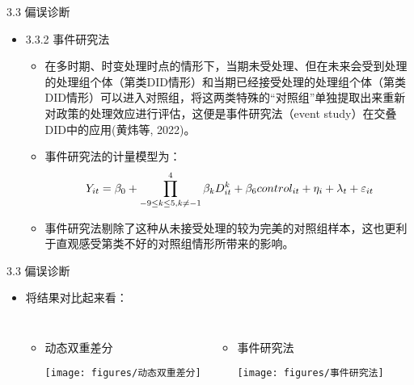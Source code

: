 \documentclass{beamer}%
\begin{document}
\begin{frame}[t]{\large 3.3 偏误诊断}
\begin{itemize}
  \item 3.3.2 事件研究法
  \begin{itemize}
  \item 在多时期、时变处理时点的情形下，当期未受处理、但在未来会受到处理的处理组个体（第类DID情形）和当期已经接受处理的处理组个体（第类DID情形）可以进入对照组，将这两类特殊的“对照组”单独提取出来重新对政策的处理效应进行评估，这便是事件研究法（event study）在交叠DID中的应用(黄炜等, 2022)。
  \item 事件研究法的计量模型为：
    \begin{equation}
    \setlength{\abovedisplayskip}{4pt}
    \setlength{\belowdisplayskip}{4pt}
        Y_{i t}=\beta_0+\prod_{-9 \leq k \leq 5, k \neq-1}^4 \beta_k D_{i t}^k+\beta_6 control_{it}+\eta_i+\lambda_t+\varepsilon_{it}
    \end{equation}
  \item 事件研究法剔除了这种从未接受处理的较为完美的对照组样本，这也更利于直观感受第类不好的对照组情形所带来的影响。
  \end{itemize}
\end{itemize}
\end{frame}

\begin{frame}[t]{\large 3.3 偏误诊断}
\begin{itemize}
\item 将结果对比起来看：
\begin{columns}[onlytextwidth]
\begin{itemize}
\item 动态双重差分
\begin{center}
		\texttt{[image: figures/动态双重差分]}
\end{center}
\end{itemize}
\begin{itemize}
\item 事件研究法
\begin{center}
		\texttt{[image: figures/事件研究法]}
\end{center}
\end{itemize}
\end{columns}
\end{itemize}
\end{frame}
\end{document}
